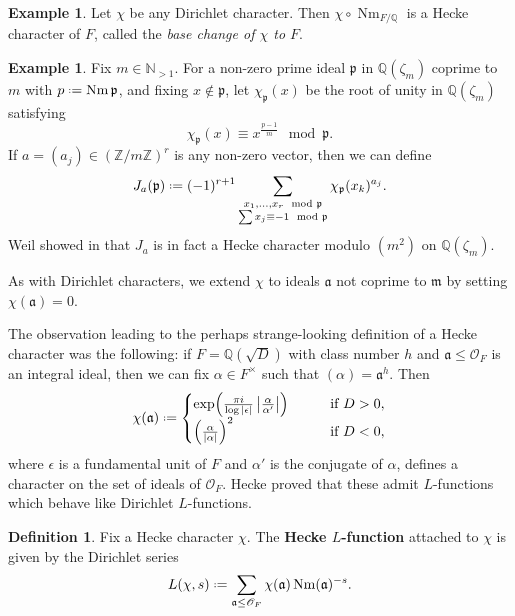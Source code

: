 \documentclass[11pt,a4paper]{article}
\let\mf\mathfrak
\newcommand{\N}{\mathbb{N}}
\newcommand{\Z}{\mathbb{Z}}
\newcommand{\Q}{\mathbb{Q}}
\renewcommand{\O}{\mathscr{O}}
\newcommand*{\defeq}{\mathrel{\vcenter{\baselineskip0.5ex \lineskiplimit0pt
      \hbox{\scriptsize.}\hbox{\scriptsize.}}}%
  =}
\DeclareMathOperator{\Nm}{Nm}
\theoremstyle{plain}
\theoremstyle{definition}
\newtheorem{mydef}[thm]{Definition}
\newtheorem{eg}[thm]{Example}
\theoremstyle{remark}
\numberwithin{equation}{section}
\begin{document}
\begin{eg}
  Let $\chi$ be any Dirichlet character. Then $\chi \circ \Nm_{F/\Q}$ is a Hecke
  character of $F$, called the \emph{base change of $\chi$ to $F$}.
\end{eg}

\begin{eg}\label{eg:Jacobi-sum}
  Fix $m \in \N_{>1}$. For a non-zero prime ideal $\mf p$ in $\Q(\zeta_{m})$ coprime to
  $m$ with $p \defeq \Nm \mf p$, and fixing $x \notin \mf p
  $, let $\chi_{\mf p }(x)$ be the root of unity in $\Q(\zeta_{m})$
  satisfying
  \begin{equation}
    \label{eq:24}
    \chi_{\mf p}(x) \equiv x^{\frac{p-1}{m}} \mod{\mf p}.
  \end{equation}
If $a = (a_{j}) \in (\Z/m\Z)^{r}$ is any non-zero vector, then we can
define
\begin{equation}
  \label{eq:25}
  J_{a}(\mf p) \defeq (-1)^{r+1} \sum_{\substack{x_{1},\ldots, x_{r} \mod \mf
      p \\ \sum x_{j} \equiv -1 \mod \mf p}}\chi_{\mf p}(x_{k})^{a_{j}}.
\end{equation}
Weil showed in \cite{weil1952} that $J_{a}$ is in fact a Hecke
character modulo $(m^{2})$ on $\Q(\zeta_{m})$.
\end{eg}

As with Dirichlet characters, we extend $\chi$ to ideals $\mf a$ not coprime to
$\mf m$ by setting $\chi (\mf a) = 0$.

The observation leading to the perhaps strange-looking definition of a
Hecke character was the following: if $F = \Q(\sqrt{D})$ with class
number $h$ and $\mf a \leq \O_{F}$ is an integral ideal, then we can fix $\alpha
\in F^{\times}$ such that $(\alpha) = \mf a^{h}$. Then
\begin{equation}
  \label{eq:27}
  \chi (\mf a) \defeq \begin{cases}
   \exp(\frac{\pi i}{\log |\epsilon|} \left|\frac{\alpha}{\alpha'}\right|) \qq{} &\text{if }D>
   0,\\
   \qty(\frac{\alpha}{|\alpha|})^{2} \qq{}&\text{if } D< 0,
 \end{cases}
\end{equation}
where $\epsilon$ is a fundamental unit of $F$ and $\alpha'$ is the conjugate of
$\alpha$, defines a character on the set of ideals of $\O_{F}$. Hecke
proved that these admit $L$-functions which behave like Dirichlet $L$-functions.
 \begin{mydef}
   Fix a Hecke character $\chi$. The \textbf{Hecke $L$-function} attached
   to $\chi$ is given by the Dirichlet series
   \begin{equation}
     \label{eq:18}
     L(\chi,s) \defeq \sum_{\mf a \leq \O_{F}} \chi(\mf a)\Nm(\mf a)^{-s}.
   \end{equation}
 \end{mydef}
\end{document}
